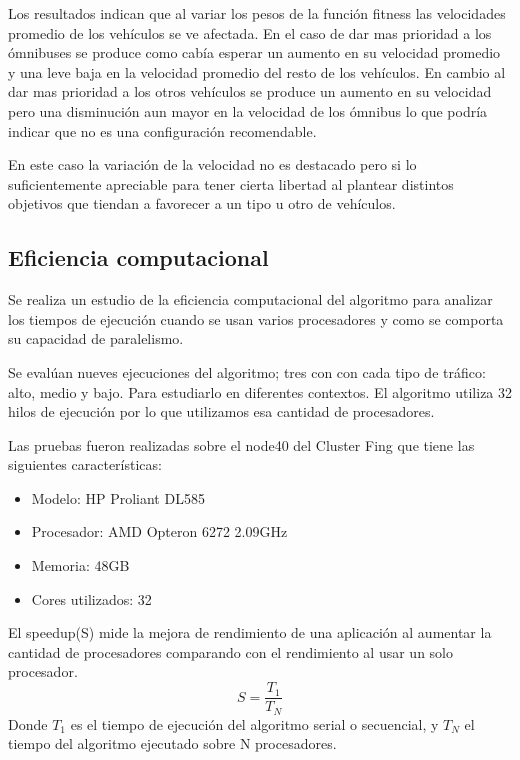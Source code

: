 Los resultados indican que al variar los pesos de la función fitness las velocidades promedio de los vehículos se ve afectada. En el caso de dar mas prioridad a los ómnibuses se produce como cabía esperar un aumento en su velocidad promedio y una leve baja en la velocidad promedio del resto de los vehículos. En cambio al dar mas prioridad a los otros vehículos se produce un aumento en su velocidad pero una disminución aun mayor en la velocidad de los ómnibus lo que podría indicar que no es una configuración recomendable. 

En este caso la variación de la velocidad no es destacado pero si lo suficientemente apreciable para tener cierta libertad al plantear distintos objetivos que tiendan a favorecer a un tipo u otro de vehículos.






\subsection{Eficiencia computacional}

Se realiza un estudio de la eficiencia computacional del algoritmo para analizar los tiempos de ejecución cuando se usan varios procesadores y como se comporta su capacidad de paralelismo.

Se evalúan nueves ejecuciones del algoritmo; tres con con cada tipo de tráfico: alto, medio y bajo. Para estudiarlo en diferentes contextos. El algoritmo utiliza 32 hilos de ejecución por lo que utilizamos esa cantidad de procesadores.

Las pruebas fueron realizadas sobre el node40 del Cluster Fing que tiene las siguientes características:

\begin{itemize}
	\item Modelo: HP Proliant DL585
	\item Procesador: AMD Opteron 6272 2.09GHz
	\item Memoria: 48GB
	\item Cores utilizados: 32
\end{itemize}





El speedup(S) mide la mejora de rendimiento de una aplicación al aumentar la cantidad de procesadores comparando con el rendimiento al usar un solo procesador.
\begin{equation}
\label{eq:funcion_speedup}
S = \frac{T_1}{T_N}
\end{equation}
Donde ${T_1}$ es el tiempo de ejecución del algoritmo serial o secuencial, y ${T_N}$ el tiempo del algoritmo ejecutado sobre N procesadores.
\newline

